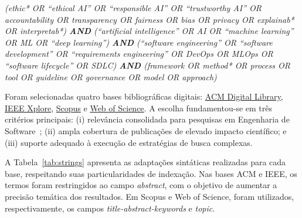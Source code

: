 \vspace{0.3cm}
\colorbox{formalshade}{\parbox{0.9\columnwidth}{\small\emph{(ethic* OR ``ethical AI'' OR ``responsible AI'' OR ``trustworthy AI'' OR accountability OR transparency OR fairness OR bias OR privacy OR explainab* OR interpretab*) \textbf{AND} (``artificial intelligence'' OR AI OR ``machine learning'' OR ML OR ``deep learning'') \textbf{AND} (``software engineering'' OR ``software development'' OR ``requirements engineering'' OR DevOps OR MLOps OR ``software lifecycle'' OR SDLC) \textbf{AND} (framework OR method* OR process OR tool OR guideline OR governance OR model OR approach)}}}
\vspace{0.3cm}

Foram selecionadas quatro bases bibliográficas digitais: \href{https://dl.acm.org/}{ACM Digital Library}, \href{https://ieeexplore.ieee.org/}{IEEE Xplore}, \href{https://www.scopus.com/}{Scopus} e \href{https://www.webofscience.com/}{Web of Science}. A escolha fundamentou-se em três critérios principais: (i) relevância consolidada para pesquisas em Engenharia de Software~\cite{Brereton2007}; (ii) ampla cobertura de publicações de elevado impacto científico; e (iii) suporte adequado à execução de estratégias de busca complexas.

A Tabela~\ref{tab:strings} apresenta as adaptações sintáticas realizadas para cada base, respeitando suas particularidades de indexação. Nas bases ACM e IEEE, os termos foram restringidos ao campo \textit{abstract}, com o objetivo de aumentar a precisão temática dos resultados. Em Scopus e Web of Science, foram utilizados, respectivamente, os campos \textit{title-abstract-keywords} e \textit{topic}.

